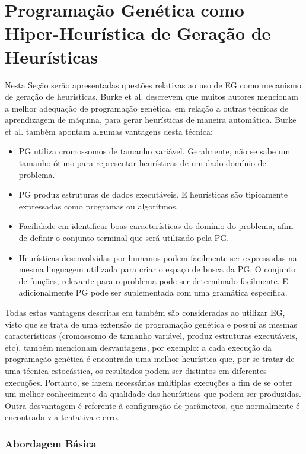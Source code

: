 \section{Programação Genética como Hiper-Heurística de Geração de Heurísticas}
\label{subsubsection:PGasHH}

Nesta Seção serão apresentadas questões relativas ao uso de EG como mecanismo de geração de heurísticas. Burke et al. \cite{burke2009exploring} descrevem que muitos autores mencionam a melhor adequação de programação genética, em relação a outras técnicas de aprendizagem de máquina, para gerar heurísticas de maneira automática. Burke et al. também apontam algumas vantagens desta técnica:

\begin{itemize}
	\item PG utiliza cromossomos de tamanho variável. Geralmente, não se sabe um tamanho ótimo para representar heurísticas de um dado domínio de problema.
	\item PG produz estruturas de dados executáveis. E heurísticas são tipicamente expressadas como programas ou algoritmos.
	\item Facilidade em identificar boas características do domínio do problema, afim de definir o conjunto terminal que será utilizado pela PG.
	\item Heurísticas desenvolvidas por humanos podem facilmente ser expressadas na mesma linguagem utilizada para criar o espaço de busca da PG. O conjunto de funções, relevante para o problema pode ser determinado facilmente. E adicionalmente PG pode ser suplementada com uma gramática específica.
\end{itemize}

Todas estas vantagens descritas em \cite{burke2009exploring} também são consideradas ao utilizar EG, visto que se trata de uma extensão de programação genética e possui as mesmas características (cromossomo de tamanho variável, produz estruturas executáveis, etc). \cite{burke2009exploring} também mencionam desvantagens, por exemplo: a cada execução da programação genética é encontrada uma melhor heurística que, por se tratar de uma técnica estocástica, os resultados podem ser distintos em diferentes execuções. Portanto, se fazem necessárias múltiplas execuções a fim de se obter um melhor conhecimento da qualidade das heurísticas que podem ser produzidas. Outra desvantagem é referente à configuração de parâmetros, que normalmente é encontrada via tentativa e erro.

\subsubsection{Abordagem Básica}

